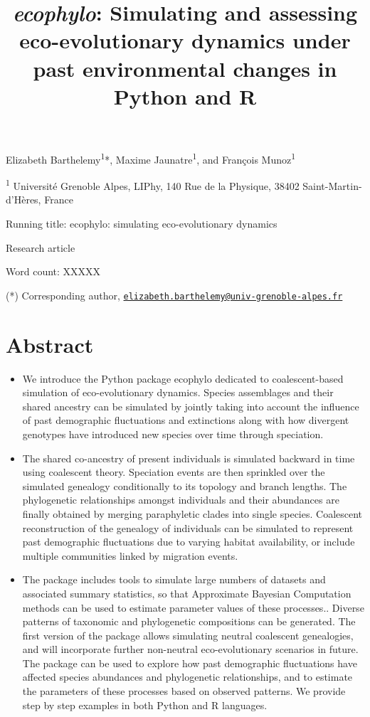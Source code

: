 \documentclass[
]{article}
\title{\emph{ecophylo}: Simulating and assessing eco-evolutionary
dynamics under past environmental changes in Python and R}
\author{}
\date{\vspace{-2.5em}}
\providecommand{\tightlist}{%
  \setlength{\itemsep}{0pt}\setlength{\parskip}{0pt}}
\begin{document}
\maketitle

Elizabeth Barthelemy\textsuperscript{1}*, Maxime
Jaunatre\textsuperscript{1}, and François Munoz\textsuperscript{1}

\textsuperscript{1} Université Grenoble Alpes, LIPhy, 140 Rue de la
Physique, 38402 Saint-Martin-d'Hères, France

Running title: ecophylo: simulating eco-evolutionary dynamics

Research article

Word count: XXXXX

(*) Corresponding author,
\href{mailto:elizabeth.barthelemy@univ-grenoble-alpes.fr}{\nolinkurl{elizabeth.barthelemy@univ-grenoble-alpes.fr}}

\newpage

\hypertarget{abstract}{%
\section{Abstract}\label{abstract}}

\begin{itemize}
\tightlist
\item
  We introduce the Python package ecophylo dedicated to coalescent-based
  simulation of eco-evolutionary dynamics. Species assemblages and their
  shared ancestry can be simulated by jointly taking into account the
  influence of past demographic fluctuations and extinctions along with
  how divergent genotypes have introduced new species over time through
  speciation.
\item
  The shared co-ancestry of present individuals is simulated backward in
  time using coalescent theory. Speciation events are then sprinkled
  over the simulated genealogy conditionally to its topology and branch
  lengths. The phylogenetic relationships amongst individuals and their
  abundances are finally obtained by merging paraphyletic clades into
  single species. Coalescent reconstruction of the genealogy of
  individuals can be simulated to represent past demographic
  fluctuations due to varying habitat availability, or include multiple
  communities linked by migration events.
\item
  The package includes tools to simulate large numbers of datasets and
  associated summary statistics, so that Approximate Bayesian
  Computation methods can be used to estimate parameter values of these
  processes.. Diverse patterns of taxonomic and phylogenetic
  compositions can be generated. The first version of the package allows
  simulating neutral coalescent genealogies, and will incorporate
  further non-neutral eco-evolutionary scenarios in future. The package
  can be used to explore how past demographic fluctuations have affected
  species abundances and phylogenetic relationships, and to estimate the
  parameters of these processes based on observed patterns. We provide
  step by step examples in both Python and R languages.
\end{itemize}
\end{document}
